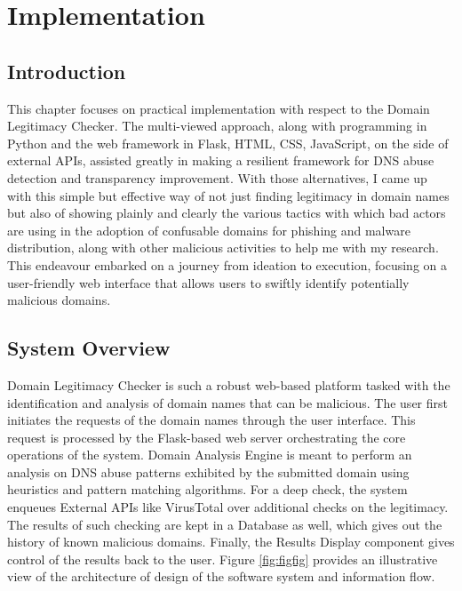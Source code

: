 \chapter{Implementation}

\section{Introduction} 

This chapter focuses on practical implementation with respect to the Domain Legitimacy Checker. The multi-viewed approach, along with programming in Python and the web framework in Flask, HTML, CSS, JavaScript, on the side of external APIs, assisted greatly in making a resilient framework for DNS abuse detection and transparency improvement. With those alternatives, I came up with this simple but effective way of not just finding legitimacy in domain names but also of showing plainly and clearly the various tactics with which bad actors are using in the adoption of confusable domains for phishing and malware distribution, along with other malicious activities to help me with my research. This endeavour embarked on a journey from ideation to execution, focusing on a user-friendly web interface that allows users to swiftly identify potentially malicious domains. 

\section{System Overview}

Domain Legitimacy Checker is such a robust web-based platform tasked with the identification and analysis of domain names that can be malicious. The user first initiates the requests of the domain names through the user interface. This request is processed by the Flask-based web server orchestrating the core operations of the system. Domain Analysis Engine is meant to perform an analysis on DNS abuse patterns exhibited by the submitted domain using heuristics and pattern matching algorithms. For a deep check, the system enqueues External APIs like VirusTotal over additional checks on the legitimacy. The results of such checking are kept in a Database as well, which gives out the history of known malicious domains. Finally, the Results Display component gives control of the results back to the user. Figure \ref{fig:figfig} provides an illustrative view of the architecture of design of the software system and information flow.


